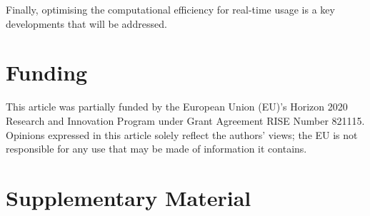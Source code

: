 \documentclass[final]{statsoc}
\begin{document}
Finally, optimising the computational efficiency for real-time usage is a key developments that will be addressed.

\section*{Funding}

This article was partially funded by the European
Union (EU)’s Horizon 2020 Research and Innovation Program under Grant Agreement RISE Number 821115. Opinions expressed in this article solely reflect the authors’ views; the EU is not responsible for any use that may be made of information it contains.

\section*{Supplementary Material}
\end{document}
